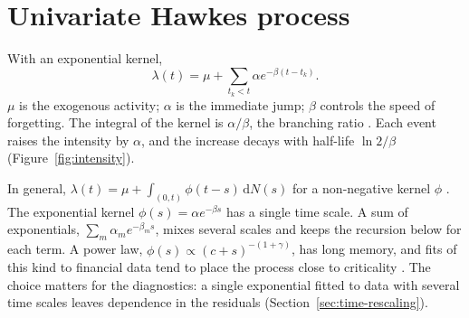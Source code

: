 \section{Univariate Hawkes process}

With an exponential kernel,
\begin{equation}
  \lambda(t)=\mu+\sum_{t_k<t}\alpha e^{-\beta(t-t_k)}.
  \label{eq:hawkes1d}
\end{equation}
\(\mu\) is the exogenous activity; \(\alpha\) is the immediate jump; \(\beta\)
controls the speed of forgetting. The integral of the kernel is \(\alpha/\beta\), the
branching ratio \citep{laub2021}. Each event raises the intensity by \(\alpha\), and the
increase decays with half-life \(\ln2/\beta\) (Figure~\ref{fig:intensity}).

In general, \(\lambda(t)=\mu+\int_{(0,t)}\phi(t-s)\,\mathrm dN(s)\) for a non-negative kernel
\(\phi\) \citep{hawkes1971}. The exponential kernel \(\phi(s)=\alpha e^{-\beta s}\) has a single
time scale. A sum of exponentials, \(\sum_m\alpha_m e^{-\beta_m s}\), mixes several scales and
keeps the recursion below for each term. A power law, \(\phi(s)\propto(c+s)^{-(1+\gamma)}\),
has long memory, and fits of this kind to financial data tend to place the process close to
criticality \citep{hardiman2013,bacry2015}. The choice matters for the diagnostics: a single
exponential fitted to data with several time scales leaves dependence in the residuals
(Section~\ref{sec:time-rescaling}).

